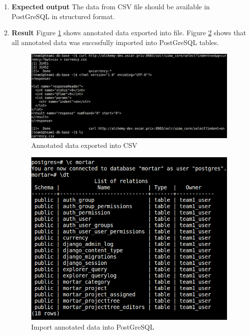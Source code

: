 \begin{enumerate}
\begin{enumerate}[label={}]
  \item \textbf{Expected output}\newline
    The data from CSV file should be available in PostGreSQL in
    structured format.
  \item \textbf{Result}\newline
    Figure \ref{csv-export} shows annotated data exported into
     file. Figure \ref{csv-import} shows that all
    annotated data was succssfully imported into PostGreSQL tables.
    \begin{figure}
      \centering
      \includegraphics[scale=0.4]{screenshots/csv-export.png}
      \caption{Annotated data exported into CSV}
      \label{csv-export}
    \end{figure}
    \begin{figure}
      \centering
      \includegraphics[scale=0.4]{screenshots/csv-import.png}
      \caption{Import annotated data into PostGreSQL}
      \label{csv-import}
    \end{figure}
  \end{enumerate}
\end{enumerate}

